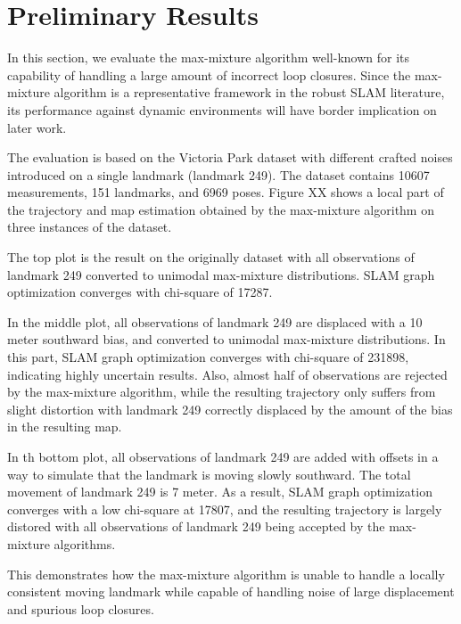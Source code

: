 \section{Preliminary Results}

In this section, we evaluate the max-mixture algorithm well-known for its
capability of handling a large amount of incorrect loop closures. Since the
max-mixture algorithm is a representative framework in the robust SLAM
literature, its performance against dynamic environments will have border
implication on later work.

The evaluation is based on the Victoria Park dataset with different crafted
noises introduced on a single landmark (landmark 249). The dataset contains
10607 measurements, 151 landmarks, and 6969 poses. Figure XX shows a local
part of the trajectory and map estimation obtained by the max-mixture
algorithm on three instances of the dataset.

The top plot is the result on the originally dataset with all observations of
landmark 249 converted to unimodal max-mixture distributions. SLAM graph
optimization converges with chi-square of 17287.

In the middle plot, all observations of landmark 249 are displaced with a 10
meter southward bias, and converted to unimodal max-mixture distributions. In
this part, SLAM graph optimization converges with chi-square of 231898,
indicating highly uncertain results. Also, almost half of observations are
rejected by the max-mixture algorithm, while the resulting trajectory only
suffers from slight distortion with landmark 249 correctly displaced by the
amount of the bias in the resulting map.

In th bottom plot, all observations of landmark 249 are added with offsets in
a way to simulate that the landmark is moving slowly southward. The total
movement of landmark 249 is 7 meter. As a result, SLAM graph optimization
converges with a low chi-square at 17807, and the resulting trajectory is
largely distored with all observations of landmark 249 being accepted by the
max-mixture algorithms.

This demonstrates how the max-mixture algorithm is unable to handle a locally
consistent moving landmark while capable of handling noise of large
displacement and spurious loop closures. 
